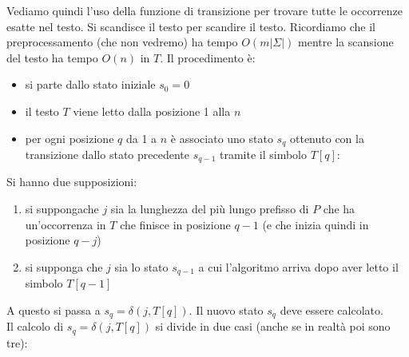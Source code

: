 \documentclass[a4paper,12pt, oneside]{book}
\begin{document}
Vediamo quindi l'uso della funzione di transizione per trovare tutte le
occorrenze esatte nel testo. Si scandisce il testo per scandire il
testo. Ricordiamo che il preprocessamento (che non vedremo) ha tempo
$O(m|\Sigma|)$ mentre la scansione del testo ha tempo $O(n)$ in $T$.
Il procedimento è:
\begin{itemize}
  \item si parte dallo stato iniziale $s_0=0$
  \item il testo $T$ viene letto dalla posizione 1 alla $n$
  \item per ogni posizione $q$ da 1 a $n$ è associato uno stato $s_q$ ottenuto
  con la transizione dallo stato precedente $s_{q-1}$ tramite il simbolo $T[q]$:
  
\end{itemize}
\begin{center}
  \end{center}
Si hanno due supposizioni:
\begin{enumerate}
  \item si suppongache $j$ sia la lunghezza del più lungo prefisso di $P$ che ha
  un’occorrenza in $T$ che finisce in posizione $q-1$ (e che inizia quindi in
  posizione $q-j$)
  \item si supponga che $j$ sia lo stato $s_{q-1}$ a cui l'algoritmo arriva dopo
  aver letto il simbolo $T[q-1]$
\end{enumerate}
A questo si passa a $s_q=\delta(j,T[q])$. Il nuovo stato $s_q$ deve essere
calcolato. \\
Il calcolo di $s_q=\delta(j, T[q])$ si divide in due casi (anche se in realtà
poi sono tre):
\end{document}

